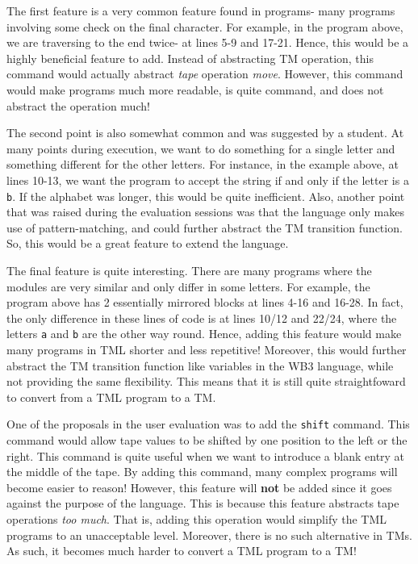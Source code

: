 The first feature is a very common feature found in programs- many programs involving some check on the final character. For example, in the program above, we are traversing to the end twice- at lines 5-9 and 17-21. Hence, this would be a highly beneficial feature to add. Instead of abstracting TM operation, this command would actually abstract \textit{tape} operation \emph{move}. However, this command would make programs much more readable, is quite command, and does not abstract the operation much!

The second point is also somewhat common and was suggested by a student. At many points during execution, we want to do something for a single letter and something different for the other letters. For instance, in the example above, at lines 10-13, we want the program to accept the string if and only if the letter is a \texttt{b}. If the alphabet was longer, this would be quite inefficient. Also, another point that was raised during the evaluation sessions was that the language only makes use of pattern-matching, and could further abstract the TM transition function. So, this would be a great feature to extend the language. 

The final feature is quite interesting. There are many programs where the modules are very similar and only differ in some letters. For example, the program above has 2 essentially mirrored blocks at lines 4-16 and 16-28. In fact, the only difference in these lines of code is at lines 10/12 and 22/24, where the letters \texttt{a} and \texttt{b} are the other way round. Hence, adding this feature would make many programs in TML shorter and less repetitive! Moreover, this would further abstract the TM transition function like variables in the WB3 language, while not providing the same flexibility. This means that it is still quite straightfoward to convert from a TML program to a TM.

One of the proposals in the user evaluation was to add the \texttt{shift} command. This command would allow tape values to be shifted by one position to the left or the right. This command is quite useful when we want to introduce a blank entry at the middle of the tape. By adding this command, many complex programs will become easier to reason! However, this feature will \textbf{not} be added since it goes against the purpose of the language. This is because this feature abstracts tape operations \textit{too much}. That is, adding this operation would simplify the TML programs to an unacceptable level. Moreover, there is no such alternative in TMs. As such, it becomes much harder to convert a TML program to a TM!


